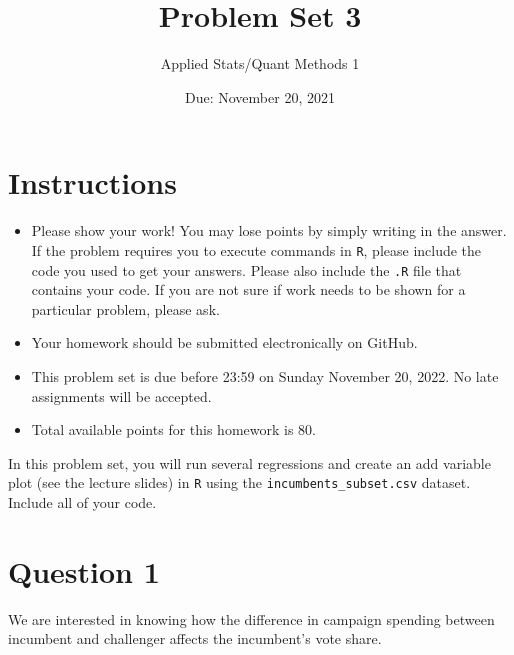 \documentclass[12pt,letterpaper]{article}
\title{Problem Set 3}
\date{Due: November 20, 2021}
\author{Applied Stats/Quant Methods 1}
\begin{document}
	\maketitle
	\section*{Instructions}
	\begin{itemize}
		\item Please show your work! You may lose points by simply writing in the answer. If the problem requires you to execute commands in \texttt{R}, please include the code you used to get your answers. Please also include the \texttt{.R} file that contains your code. If you are not sure if work needs to be shown for a particular problem, please ask.
	\item Your homework should be submitted electronically on GitHub.
	\item This problem set is due before 23:59 on Sunday November 20, 2022. No late assignments will be accepted.
	\item Total available points for this homework is 80.
	\end{itemize}

		\vspace{.25cm}
	
\noindent In this problem set, you will run several regressions and create an add variable plot (see the lecture slides) in \texttt{R} using the \texttt{incumbents\_subset.csv} dataset. Include all of your code.

\newpage

\section*{Question 1}
\vspace{.25cm}
\noindent We are interested in knowing how the difference in campaign spending between incumbent and challenger affects the incumbent's vote share.
\end{document}
